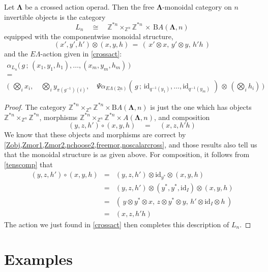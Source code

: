 \documentclass{amsbook} %
\newcommand{\id}{\textrm{id}}
\newcommand{\ML}{\mathbf{\Lambda}}
\newcommand{\ELnn}{E\Lambda(\underline{2n})}
\numberwithin{section}{chapter}
\begin{document}
\begin{thm}\label{freeinvalgc} Let $\ML$ be a crossed action operad. Then the free $\ML$-monoidal category on $n$ invertible objects is the category
\[ L_n \quad \cong \quad \mathbb{Z}^{\ast n} \times_{\mathbb{Z}^n} \mathbb{Z}^{\ast n}  \, \times \, \mathrm{B}A(\ML,n) \]
equipped with the componentwise monoidal structure,
\[ (x', y' ,h') \otimes (x, y, h) \, = \, ( \, x' \otimes x, \, y' \otimes y, \, h'h \, ) \]
and the $E\Lambda$-action given in \cref{crossact}:
\[ \begin{array}{c}
			\alpha_{L_n}\big( \, g \, ; \, (x_1, y_1, h_1), \ldots, (x_m, y_m, h_m) \, \big) \\
			= \\
			\big( \, \, \bigotimes_i x_i, \quad \bigotimes_i y_{\pi(g^{-1})(i)}, \quad \Psi \alpha_{\ELnn}( \, g \, ; \, \id_{q^{-1}(y_1)}, \ldots, \id_{q^{-1}(y_m)} \, \, ) \, \otimes \, (\bigotimes_i h_i) \, \big) 
		\end{array}
\]
\end{thm}
\begin{proof}
The category $\mathbb{Z}^{\ast n} \times_{\mathbb{Z}^n} \mathbb{Z}^{\ast n} \times \mathrm{B}A(\ML,n)$ is just the one which has objects $\mathbb{Z}^{\ast n} \times_{\mathbb{Z}^n} \mathbb{Z}^{\ast n}$, morphisms $\mathbb{Z}^{\ast n} \times_{\mathbb{Z}^n} \mathbb{Z}^{\ast n} \times A(\ML,n)$, and composition 
\[ (y, z , h') \circ (x, y, h) \quad = \quad (x, z, h'h) \]
We know that these objects and morphisms are correct by \cref{Zobj,Zmor1,Zmor2,nchoose2,freemor,noscalarcross}, and those results also tell us that the monoidal structure is as given above. For composition, it follows from \cref{tenscomp} that
\[ \begin{array}{rll} 
			(y, z , h') \circ (x, y, h) & = & (y, z , h') \otimes \id_{y^*} \otimes (x, y, h) \\
			& = & (y, z , h') \otimes (y^*, y^*, \id_I) \otimes (x, y, h) \\
			& = & (\, y \otimes y^* \otimes x, \,  z \otimes y^* \otimes y, \, h' \otimes \id_I \otimes h \, ) \\
			& = & (x, z, h'h)
		\end{array}
\]
The action we just found in \cref{crossact} then completes this description of $L_n$.
\end{proof}

\chapter{Examples}
\end{document}
